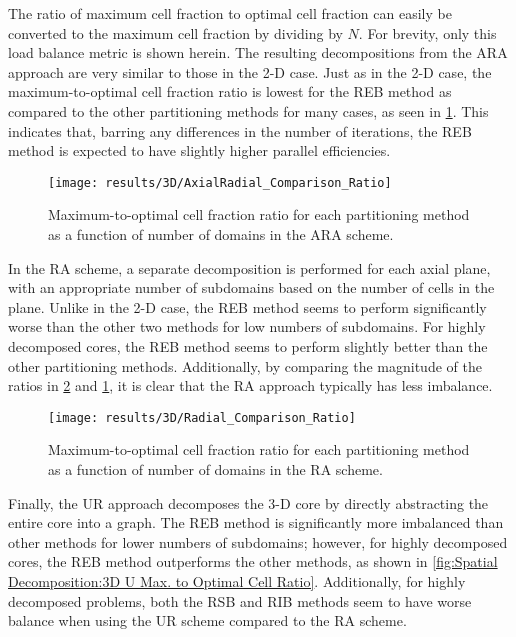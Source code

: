 {{{      The ratio of maximum cell fraction to optimal cell fraction can easily be converted to the maximum cell fraction by dividing by $N$.
      For brevity, only this load balance metric is shown herein.
      The resulting decompositions from the \ac{ARA} approach are very similar to those in the 2-D case.
      Just as in the 2-D case, the maximum-to-optimal cell fraction ratio is lowest for the \ac{REB} method as compared to the other partitioning methods for many cases, as seen in \cref{fig:Spatial Decomposition:3D AR Max. to Optimal Cell Ratio}.
      This indicates that, barring any differences in the number of iterations, the \ac{REB} method is expected to have slightly higher parallel efficiencies.

      \begin{figure}
        \centering
        \texttt{[image: results/3D/AxialRadial\_Comparison\_Ratio]}
        \caption{Maximum-to-optimal cell fraction ratio for each partitioning method as a function of number of domains in the \acf{ARA} scheme. \label{fig:Spatial Decomposition:3D AR Max. to Optimal Cell Ratio}}
      \end{figure}

      In the \ac{RA} scheme, a separate decomposition is performed for each axial plane, with an appropriate number of subdomains based on the number of cells in the plane.
      Unlike in the 2-D case, the \ac{REB} method seems to perform significantly worse than the other two methods for low numbers of subdomains.
      For highly decomposed cores, the \ac{REB} method seems to perform slightly better than the other partitioning methods.
      Additionally, by comparing the magnitude of the ratios in \cref{fig:Spatial Decomposition:3D R Max. to Optimal Cell Ratio} and \cref{fig:Spatial Decomposition:3D AR Max. to Optimal Cell Ratio}, it is clear that the \ac{RA} approach typically has less imbalance.

      \begin{figure}
        \centering
        \texttt{[image: results/3D/Radial\_Comparison\_Ratio]}
        \caption{Maximum-to-optimal cell fraction ratio for each partitioning method as a function of number of domains in the \acf{RA} scheme. \label{fig:Spatial Decomposition:3D R Max. to Optimal Cell Ratio}}
      \end{figure}

      Finally, the \ac{UR} approach decomposes the 3-D core by directly abstracting the entire core into a graph.
      The \ac{REB} method is significantly more imbalanced than other methods for lower numbers of subdomains; however, for highly decomposed cores, the \ac{REB} method outperforms the other methods, as shown in \cref{fig:Spatial Decomposition:3D U Max. to Optimal Cell Ratio}.
      Additionally, for highly decomposed problems, both the \ac{RSB} and \ac{RIB} methods seem to have worse balance when using the \ac{UR} scheme compared to the \ac{RA} scheme.

}}}

